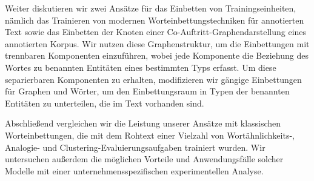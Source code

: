 Weiter diskutieren wir zwei Ansätze für das Einbetten von Trainingseinheiten, nämlich das Trainieren von modernen Worteinbettungstechniken für annotierten Text sowie das Einbetten der Knoten einer Co-Auftritt-Graphendarstellung eines annotierten Korpus. Wir nutzen diese Graphenstruktur, um die Einbettungen mit trennbaren Komponenten einzuführen, wobei jede Komponente die Beziehung des Wortes zu benannten Entitäten eines bestimmten Typs erfasst. Um diese separierbaren Komponenten zu erhalten, modifizieren wir gängige Einbettungen für Graphen und Wörter, um den Einbettungsraum in Typen der benannten Entitäten zu unterteilen, die im Text vorhanden sind.

Abschließend vergleichen wir die Leistung unserer Ansätze mit klassischen Worteinbettungen, die mit dem Rohtext einer Vielzahl von Wortähnlichkeits-, Analogie- und Clustering-Evaluierungsaufgaben trainiert wurden. Wir untersuchen außerdem die möglichen Vorteile und Anwendungsfälle solcher Modelle mit einer unternehmensspezifischen experimentellen Analyse.